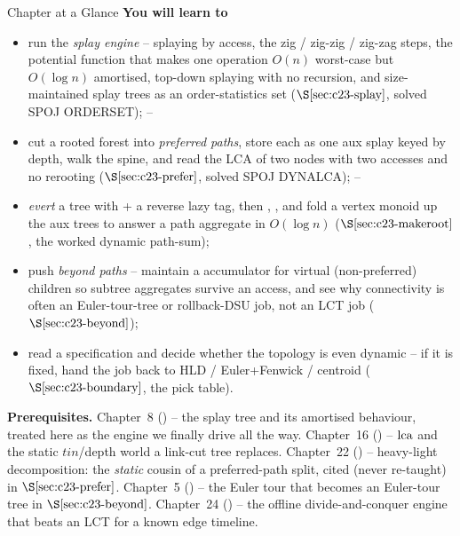 \begin{chaptertheorybox}{Chapter at a Glance}
\textbf{You will learn to}
\begin{itemize}[nosep]
  \item run the \emph{splay engine} -- splaying by access, the zig / zig-zig /
        zig-zag steps, the potential function that makes one operation \(O(n)\)
        worst-case but \(O(\log n)\) amortised, top-down splaying with no
        recursion, and size-maintained splay trees as an order-statistics set
        (\(\secref{c23-splay}\), solved SPOJ ORDERSET); \hfill{}--
  \item cut a rooted forest into \emph{preferred paths}, store each as one aux
        splay keyed by depth, walk the  spine, and read the LCA of
        two nodes with two accesses and no rerooting
        (\(\secref{c23-prefer}\), solved SPOJ DYNALCA); \hfill{}--
  \item \emph{evert} a tree with  + a reverse lazy tag, then
        , , and fold a vertex monoid up the aux trees to
        answer a path aggregate in \(O(\log n)\)
        (\(\secref{c23-makeroot}\), the worked dynamic path-sum); \hfill{}
  \item push \emph{beyond paths} -- maintain a  accumulator for virtual
        (non-preferred) children so subtree aggregates survive an access, and see
        why connectivity is often an Euler-tour-tree or rollback-DSU job, not an
        LCT job (\(\secref{c23-beyond}\)); \hfill{}
  \item read a specification and decide whether the topology is even dynamic --
        if it is fixed, hand the job back to HLD / Euler+Fenwick / centroid
        (\(\secref{c23-boundary}\), the pick table). \hfill{}
\end{itemize}

\textbf{Prerequisites.} Chapter~8 () -- the splay tree and its
amortised behaviour, treated here as the engine we finally drive all the way.
Chapter~16 () -- \(\operatorname{lca}\) and the static \(\mathit{tin}\)/depth world a
link-cut tree replaces.  Chapter~22 () -- heavy-light decomposition:
the \emph{static} cousin of a preferred-path split, cited (never re-taught) in
\(\secref{c23-prefer}\).  Chapter~5 () -- the Euler tour that becomes
an Euler-tour tree in \(\secref{c23-beyond}\).  Chapter~24 () -- the
offline divide-and-conquer engine that beats an LCT for a known edge timeline.
\end{chaptertheorybox}

